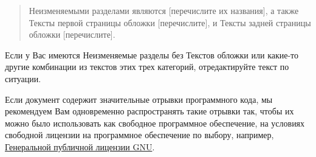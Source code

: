 \bigskip
\begin{quote}
Неизменяемыми разделами являются [перечислите их названия], а также
Тексты первой страницы обложки [перечислите], и Тексты задней страницы
обложки [перечислите].
\end{quote}
\bigskip

Если у Вас имеются Неизменяемые разделы без Текстов обложки или
какие-то другие комбинации из текстов этих трех категорий,
отредактируйте текст по ситуации.

Если документ содержит значительные отрывки программного кода, мы
рекомендуем Вам одновременно распространять такие отрывки так, чтобы
их можно было использовать как свободное программное обеспечение, на
условиях свободной лицензии на программное обеспечение по выбору,
например,
\href{https://www.gnu.org/licenses/gpl-3.0.en.html}{Генеральной
  публичной лицензии GNU}.
